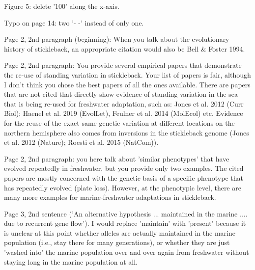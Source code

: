 \begin{point}{}
Figure 5: delete '100' along the x-axis.
\end{point}


\begin{point}{}
Typo on page 14: two '- -' instead of only one.
\end{point}


\begin{point}{}
Page 2, 2nd paragraph (beginning): When you talk about the evolutionary history of stickleback, an appropriate citation would also be Bell \& Foster 1994.
\end{point}

\reply{
}

\begin{point}{}
Page 2, 2nd paragraph: You provide several empirical papers that demonstrate the re-use of standing variation in stickleback. Your list of papers is fair, although I don't think you chose the best papers of all the ones available. There are papers that are not cited that directly show evidence of standing variation in the sea that is being re-used for freshwater adaptation, such as: Jones et al. 2012 (Curr Biol); Haenel et al. 2019 (EvolLet), Feulner et al. 2014 (MolEcol) etc. Evidence for the reuse of the exact same genetic variation at different locations on the northern hemisphere also comes from inversions in the stickleback genome (Jones et al. 2012 (Nature); Roesti et al. 2015 (NatCom)).
\end{point}

\reply{
}

\begin{point}{}
Page 2, 2nd paragraph: you here talk about 'similar phenotypes' that have evolved repeatedly in freshwater, but you provide only two examples. The cited papers are mostly concerned with the genetic basis of a specific phenotype that has repeatedly evolved (plate loss). However, at the phenotypic level, there are many more examples for marine-freshwater adaptations in stickleback.
\end{point}

\reply{
}

\begin{point}{}
Page 3, 2nd sentence ('An alternative hypothesis ... maintained in the marine .... due to recurrent gene flow'). I would replace 'maintain' with 'present' because it is unclear at this point whether alleles are actually maintained in the marine population (i.e., stay there for many generations), or whether they are just 'washed into' the marine population over and over again from freshwater without staying long in the marine population at all.
\end{point}

